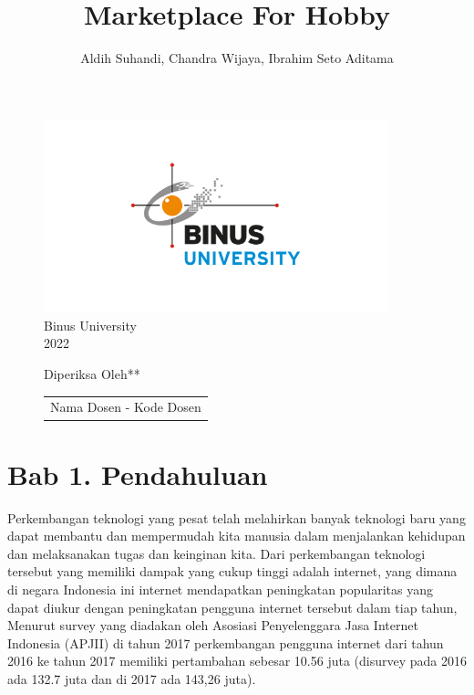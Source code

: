 \documentclass[a4paper]{article}
\begin{document}
\linespread{1.5}

\title{Marketplace For Hobby}
\author{Aldih Suhandi, Chandra Wijaya, Ibrahim Seto Aditama}

\maketitle
\begin{figure}[h]
    \centering
    \includegraphics[width=10cm]{logo_binus.png}\\
    Binus University\\
    2022
\end{figure}
\begin{figure}[h]
    \centering
    Diperiksa Oleh**\\
    \vspace{15mm}
    \begin{tabular}{@{}p{2.5in}@{}}
    \centering
    Nama Dosen - Kode Dosen
    \end{tabular}
\end{figure}

\newpage
{}
\tableofcontents

\newpage
\section*{Bab 1. Pendahuluan}

Perkembangan teknologi yang pesat telah melahirkan banyak teknologi baru yang dapat membantu dan mempermudah kita manusia dalam menjalankan kehidupan dan melaksanakan tugas dan keinginan kita. Dari perkembangan teknologi tersebut yang memiliki dampak yang cukup tinggi adalah internet, yang dimana di negara Indonesia ini internet mendapatkan peningkatan popularitas yang dapat diukur dengan peningkatan pengguna internet tersebut dalam tiap tahun, Menurut survey yang diadakan oleh Asosiasi Penyelenggara Jasa Internet Indonesia (APJII) di tahun 2017 perkembangan pengguna internet dari tahun 2016 ke tahun 2017 memiliki pertambahan sebesar 10.56 juta (disurvey pada 2016 ada 132.7 juta dan di 2017 ada 143,26 juta)\autocite{indonesia2017infografis}.
\end{document}

